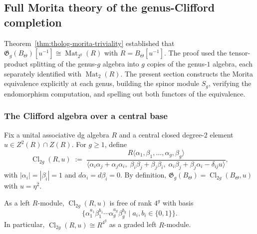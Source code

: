 
\providecommand{\Gg}{\mathfrak{G}}
\providecommand{\Sgmod}{S_g}
\providecommand{\Mbar}{\overline{\mathcal{M}}}
\providecommand{\ChirHoch}{\operatorname{ChirHoch}}

\subsection{Full Morita theory of the genus-Clifford completion}


Theorem~\ref{thm:tholog-morita-triviality} established that
$\Gg_g(B_\Theta)[u^{-1}] \cong \operatorname{Mat}_{2^g}(R)$
with $R = B_\Theta[u^{-1}]$.
The proof used the tensor-product splitting of the genus-$g$
algebra into $g$ copies of the genus-$1$ algebra, each
separately identified with $\operatorname{Mat}_2(R)$.
The present section constructs the Morita equivalence
explicitly at each genus, building the spinor module $\Sgmod$,
verifying the endomorphism computation, and spelling out
both functors of the equivalence.

\subsubsection{The Clifford algebra over a central base}

Fix a unital associative dg algebra $R$ and a central
closed degree-$2$ element $u \in Z^2(R) \cap Z(R)$.
For $g \geq 1$, define
\[
\operatorname{Cl}_{2g}(R,u)
\;:=\;
\frac{R\langle \alpha_1,\beta_1,\dots,\alpha_g,\beta_g \rangle}
{\bigl\langle
 \alpha_i\alpha_j + \alpha_j\alpha_i,\;
 \beta_i\beta_j + \beta_j\beta_i,\;
 \alpha_i\beta_j + \beta_j\alpha_i - \delta_{ij}u
\bigr\rangle},
\]
with $|\alpha_i| = |\beta_i| = 1$ and $d\alpha_i = d\beta_i = 0$.
By definition, $\Gg_g(B_\Theta) = \operatorname{Cl}_{2g}(B_\Theta, u)$
with $u = \eta^2$.

\begin{lemma}
\label{lem:tholog-clifford-pbw}
As a left $R$-module, $\operatorname{Cl}_{2g}(R,u)$ is free of rank
$4^g$ with basis
\[
\big\{
 \alpha_1^{a_1}\beta_1^{b_1}\cdots\alpha_g^{a_g}\beta_g^{b_g}
 \;\big|\;
 a_i, b_i \in \{0,1\}
\big\}.
\]
In particular, $\operatorname{Cl}_{2g}(R,u) \cong R^{4^g}$ as a
graded left $R$-module.
\end{lemma}

